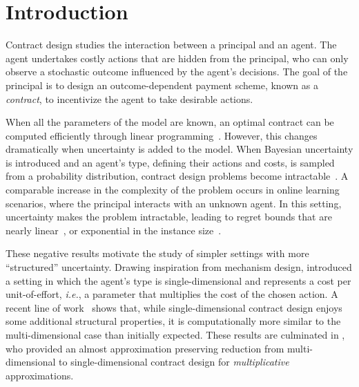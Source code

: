 \section{Introduction}

Contract design studies the interaction between a principal and an agent.
The agent undertakes costly actions that are hidden from the principal, who can only observe a stochastic outcome influenced by the agent's decisions.
The goal of the principal is to design an outcome-dependent payment scheme, known as a \emph{contract}, to incentivize the agent to take desirable actions.

When all the parameters of the model are known, an optimal contract can be computed efficiently through linear programming~\citep{dutting2019simple}.
%
However, this changes dramatically when uncertainty is added to the model. When Bayesian uncertainty is introduced and an agent's type, defining their actions and costs, is sampled from a probability distribution, contract design problems become intractable~\citep{castiglioni2022bayesian,guruganesh2021contracts,castiglioni2023designing}.
%
A comparable increase in the complexity of the problem occurs in online learning scenarios, where the principal interacts with an unknown agent. In this setting, uncertainty makes the problem intractable, leading to regret bounds that are nearly linear~\citep{zhu2022online}, or exponential in the instance size~\citep{bacchiocchi2023learning}.

These negative results motivate the study of simpler settings with more ``structured'' uncertainty. Drawing inspiration from mechanism design, \citet{alon2021contracts} introduced a setting in which the agent's type is single-dimensional and represents a cost per unit-of-effort, \emph{i.e.}, a parameter that multiplies the cost of the chosen action.
%
A recent line of work~\citep{alon2021contracts,alon2023bayesian,castiglioni2025reduction} shows that, while single-dimensional contract design enjoys some additional structural properties, it is computationally more similar to the multi-dimensional case than initially expected.
%
These results are culminated in \citet{castiglioni2025reduction}, who provided an almost approximation preserving reduction from multi-dimensional to single-dimensional contract design for \emph{multiplicative} approximations. 

